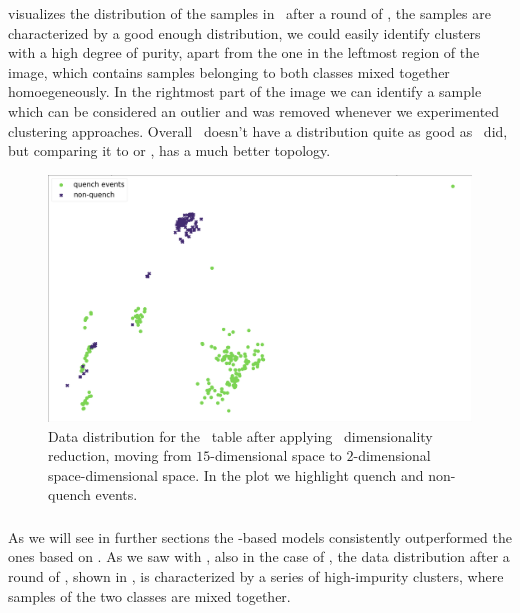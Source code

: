  visualizes the distribution of the samples in \cnmod\ after a round of \pca,
the samples are characterized by a good enough distribution, we could easily identify clusters with
a high degree of purity, apart from the one in the leftmost region of the image, which contains
samples belonging to both classes mixed together homoegeneously. In the rightmost part of the image
we can identify a sample which can be considered an outlier and was removed whenever we experimented
clustering approaches. Overall \cnmod\ doesn't have a distribution quite as good as \an\ did, but comparing it to  or , has a much better topology.
\begin{figure}[!ht]
	\centering
	\includegraphics[width=\linewidth]{img/Cnmod_distribution.png}
	\caption{Data distribution for the \cnmod\ table after applying \pca\ dimensionality
		reduction, moving from $15$-dimensional space to $2$-dimensional space-dimensional
		space. In the plot we highlight quench and non-quench events.} \label{fig:cnmod-dist}
\end{figure}

\subsubsection{\phin}
As we will see in further sections the \phin-based models consistently outperformed the ones based
on \bn. As we saw with \bn, also in the case of \phin, the data distribution after a round of \pca,
shown in , is characterized by a series of high-impurity clusters, where samples of the two classes are mixed together.

